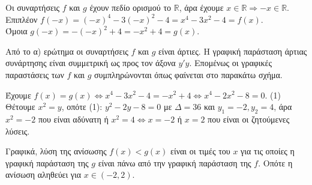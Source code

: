 \begin{alist}
\item Οι συναρτήσεις $f$ και $g$ έχουν πεδίο ορισμού το $\mathbb{R}$, άρα έχουμε $x \in \mathbb{R} \Rightarrow -x \in \mathbb{R}$. \\
Επιπλέον $f(-x) = (-x)^4 - 3(-x)^2 - 4 = x^4 - 3x^2 - 4 = f(x)$. \\
Όμοια $g(-x) = -(-x)^2 + 4 = -x^2 + 4 = g(x)$.
\item Από το α) ερώτημα οι συναρτήσεις $f$ και $g$ είναι άρτιες. Η γραφική παράσταση άρτιας συνάρτησης είναι συμμετρική ως προς τον άξονα $y'y$. Επομένως οι γραφικές παραστάσεις των $f$ και $g$ συμπληρώνονται όπως φαίνεται στο παρακάτω σχήμα.
\begin{center}
\end{center}
\item
\begin{rlist}
\item Έχουμε $f(x) = g(x) \Leftrightarrow x^4 - 3x^2 - 4 = -x^2 + 4 \Leftrightarrow x^4 - 2x^2 - 8 = 0$. (1) \\
Θέτουμε $x^2 = y$, οπότε (1): $y^2 - 2y - 8 = 0$ με $\Delta = 36$ και $y_1 = -2, y_2 = 4$, άρα $x^2 = -2$ που είναι αδύνατη ή $x^2 = 4 \Leftrightarrow x = -2$ ή $x = 2$ που είναι οι ζητούμενες λύσεις.
\item Γραφικά, λύση της ανίσωσης $f(x) < g(x)$ είναι οι τιμές του $x$ για τις οποίες η γραφική παράσταση της $g$ είναι πάνω από την γραφική παράσταση της $f$. Οπότε η ανίσωση αληθεύει για $x \in (-2, 2)$.
\end{rlist}
\end{alist}

